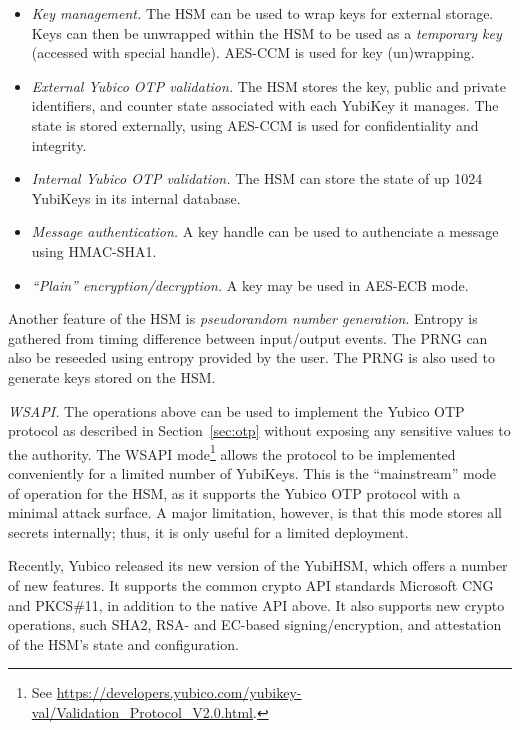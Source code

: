 \begin{itemize}
  \item \textit{Key management.} The HSM can be used to wrap keys for external
    storage. Keys can then be unwrapped within the HSM to be used as a
    \emph{temporary key} (accessed with special handle). AES-CCM is used for key
    (un)wrapping.

  \item \textit{External Yubico OTP validation.} The HSM stores the key, public and private
    identifiers, and counter state associated with each YubiKey it manages. The
    state is stored externally, using AES-CCM is used for confidentiality and
    integrity.

  \item \textit{Internal Yubico OTP validation.} The HSM can store the state of
    up 1024 YubiKeys in its internal database.

  \item \textit{Message authentication.} A key handle can be used to authenciate
    a message using HMAC-SHA1.

  \item \textit{``Plain'' encryption/decryption.} A key may be used in AES-ECB mode.
\end{itemize}
Another feature of the HSM is \textit{pseudorandom number generation}. Entropy
is gathered from timing difference between input/output events. The PRNG can
also be reseeded using entropy provided by the user. The PRNG is also used to
generate keys stored on the HSM.
%

\textit{WSAPI.}
%
The operations above can be used to implement the Yubico OTP protocol as
described in Section~\ref{sec:otp} without exposing any sensitive values to the
authority.
%
The WSAPI mode\footnote{See
\url{https://developers.yubico.com/yubikey-val/Validation_Protocol_V2.0.html}.}
allows the protocol to be implemented conveniently for a limited number of
YubiKeys.
%
This is the ``mainstream'' mode of operation for the HSM, as it supports the
Yubico OTP protocol with a minimal attack surface. A major limitation, however,
is that this mode stores all secrets internally; thus, it is only useful for a
limited deployment.

%
Recently, Yubico released its new version of the YubiHSM, which offers a number
of new features. It supports the common crypto API standards Microsoft CNG and
PKCS\#11, in addition to the native API above.
%
%
It also supports new crypto operations, such SHA2, RSA- and EC-based
signing/encryption, and attestation of the HSM's state and configuration.
